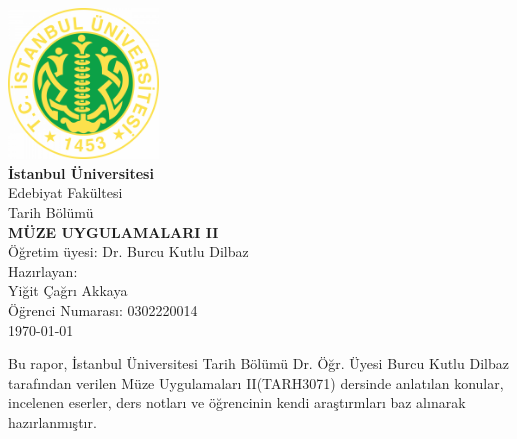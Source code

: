 \documentclass{assignment}
\begin{document}
\begin{titlepage}
    \begin{center}
        \includegraphics[width=4cm]{assets/logo.png} \\[1cm]

        \vfill 
        {\Large \textbf{İstanbul Üniversitesi}} \\[0.5cm]

        {\large Edebiyat Fakültesi \\ Tarih Bölümü} \\[1.5cm]

        {\huge \textbf{MÜZE UYGULAMALARI II}} \\[0.5cm]
        {\Large Öğretim üyesi: Dr. Burcu Kutlu Dilbaz} \\[1cm]

        \vfill 
        {\large Hazırlayan:} \\[0.2cm]
        {\Large Yiğit Çağrı Akkaya} \\[0.2cm]
        {\large Ö\"{g}renci Numarası: 0302220014} \\[0.2cm]
        \vfill
        {\large \today}
    \end{center}
\end{titlepage}

\tableofcontents
\newpage

\indent\indent Bu rapor, İstanbul Üniversitesi Tarih Bölümü Dr. Öğr. Üyesi Burcu Kutlu Dilbaz tarafından verilen Müze Uygulamaları II(TARH3071) dersinde anlatılan konular, incelenen eserler, ders notları ve öğrencinin kendi araştırmları baz alınarak hazırlanmıştır.



\newpage
\printbibliography
\end{document}
